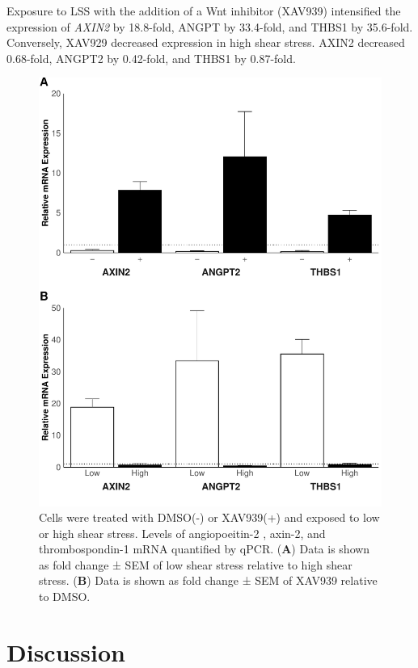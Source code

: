 \documentclass[
  12pt,
]{article}
\begin{document}
Exposure to LSS with the addition of a Wnt inhibitor (XAV939) intensified the expression of \emph{AXIN2} by 18.8-fold, ANGPT by 33.4-fold, and THBS1 by 35.6-fold. Conversely, XAV929 decreased expression in high shear stress. AXIN2 decreased 0.68-fold, ANGPT2 by 0.42-fold, and THBS1 by 0.87-fold.

\begin{figure}
\centering
\includegraphics{report_files/figure-latex/plots-1.pdf}
\caption{\label{fig:plots}Cells were treated with DMSO(-) or XAV939(+) and exposed to low or high shear stress. Levels of angiopoeitin-2 , axin-2, and thrombospondin-1 mRNA quantified by qPCR. (\textbf{A}) Data is shown as fold change ± SEM of low shear stress relative to high shear stress. (\textbf{B}) Data is shown as fold change ± SEM of XAV939 relative to DMSO.}
\end{figure}

\hypertarget{discussion}{%
\section{Discussion}\label{discussion}}
\end{document}
